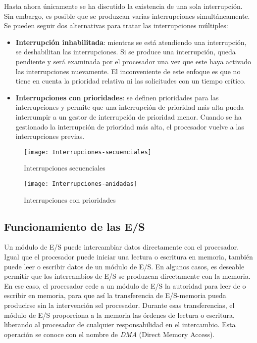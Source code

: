 Hasta ahora únicamente se ha discutido la existencia de una sola interrupción. Sin embargo, es posible que se produzcan varias interrupciones simultáneamente. 
Se pueden seguir dos alternativas para tratar las interrupciones múltiples:

\begin{itemize}
  \item \textbf{Interrupción inhabilitada}: mientras se está atendiendo una interrupción, se deshabilitan las interrupciones. Si se produce una interrupción, queda pendiente y será examinada por el procesador una vez que este haya activado las interrupciones nuevamente.
  El inconveniente de este enfoque es que no tiene en cuenta la prioridad relativa ni las solicitudes con un tiempo crítico. 
  \item \textbf{Interrupciones con prioridades}: se definen prioridades para las interrupciones y permite que una interrupción de prioridad más alta pueda interrumpir a un gestor de interrupción de prioridad menor. Cuando se ha gestionado la interrupción de prioridad más alta, el procesador vuelve a las interrupciones previas.
\end{itemize}

\begin{figure}[H]
  \centering
  \texttt{[image: Interrupciones-secuenciales]}
  \caption{Interrupciones secuenciales}
\end{figure}

\begin{figure}[H]
  \centering
  \texttt{[image: Interrupciones-anidadas]}
  \caption{Interrupciones con prioridades}
\end{figure}

\subsection{Funcionamiento de las E/S}

Un módulo de E/S puede intercambiar datos directamente con el procesador. Igual que el procesador puede iniciar una lectura o escritura en memoria, también puede leer o escribir datos de un módulo de E/S.
En algunos casos, es deseable permitir que los intercambios de E/S se produzcan directamente con la memoria. En ese caso, el procesador cede a un módulo de E/S la autoridad para leer de o escribir en memoria, para que así la transferencia de E/S-memoria pueda producirse sin la intervención  sel procesador.
Durante esas transferencias, el módulo de E/S proporciona a la memoria las órdenes de lectura o escritura, liberando al procesador de cualquier responsabilidad en el intercambio. Esta operación se conoce con el nombre de \textit{DMA} (Direct Memory Access).

